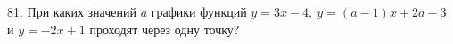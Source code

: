 81. При каких значений $a$ графики функций $y=3x-4,\ y=(a-1)x+2a-3$ и $y=-2x+1$ проходят через одну точку?\\
